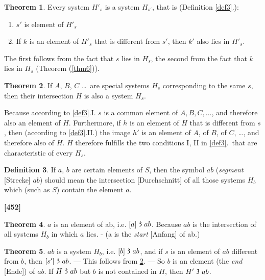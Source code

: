 \documentclass[leqno, hidelinks]{article}
\theoremstyle{definition}
\newtheorem{theorem}{Theorem}
\newtheorem{definition}[theorem]{Definition}
\newcommand\partof{\mathrel{\raisebox{0.45ex}{$\mathfrak{3}$}}}
\begin{document}
\begin{theorem}\label{thm7}
Every system $H'_s$ is a system $H_{s'}$, that is (Definition \ref{def3}.):
\begin{enumerate}[I'.]
	\item $s'$ is element of $H'_s$
	\item If $k$ is an element of $H'_s$ that is different from $s'$, then $k'$ also lies in $H'_s$.
\end{enumerate}\end{theorem}

The first follows from the fact that $s$ lies in $H_s$, the second from the fact that $k$ lies in $H_s$ (Theorem (\ref{thm6})).

\begin{theorem}\label{thm8}
If $A$, $B$, $C$ \ldots\ are special systems $H_s$ corresponding to the same $s$, then their intersection $H$ is also a system $H_s$.\end{theorem}

Because according to \ref{def3}.I. $s$ is a common element of $A, B, C, \ldots$, and therefore also an element of $H$.
Furthermore, if $h$ is an element of $H$ that is different from $s$, then (according to \ref{def3}.II.) the image $h'$ is an element of $A$, of $B$, of $C$, \ldots, and therefore also of $H$.
$H$ therefore fulfills the two conditions I, II in \ref{def3}.\ that are characteristic of every $H_s$.

\begin{definition}\label{def9}
If $a$, $b$ are certain elements of $S$, then the symbol $ab$ (\emph{segment} [Strecke] $ab$) should mean the intersection [Durchschnitt] of all those systems $H_b$  which (such as $S$) contain the element $a$.
\end{definition}

\noindent \textbf{[452]}

\begin{theorem}\label{thm10}
$a$ is an element of ab, i.e. $[a] \partof ab$. Because $ab$ is the intersection of all systems $H_b$ in which $a$ lies. - (a is the \emph{start} [Anfang] of ab.)
\end{theorem}

\begin{theorem}\label{thm11}
$ab$ is a system $H_b$, i.e. $[b] \partof ab$, and if $s$ is an element of $ab$ different from $b$, then $[s'] \partof ab$.
--- This follows from \ref{thm8}. --- So $b$ is an element (the \emph{end} [Ende]) of $ab$. If $H \partof ab$ but $b$ is not contained in $H$, then $H' \partof ab$.
\end{theorem}
\end{document}
